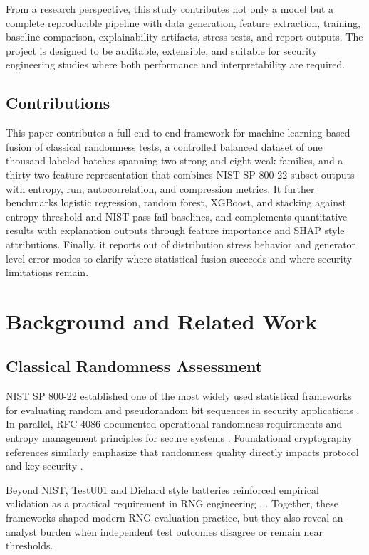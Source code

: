 \documentclass[conference]{IEEEtran}
\begin{document}
From a research perspective, this study contributes not only a model but a complete reproducible pipeline with data generation, feature extraction, training, baseline comparison, explainability artifacts, stress tests, and report outputs. The project is designed to be auditable, extensible, and suitable for security engineering studies where both performance and interpretability are required.

\subsection{Contributions}
This paper contributes a full end to end framework for machine learning based fusion of classical randomness tests, a controlled balanced dataset of one thousand labeled batches spanning two strong and eight weak families, and a thirty two feature representation that combines NIST SP 800-22 subset outputs with entropy, run, autocorrelation, and compression metrics. It further benchmarks logistic regression, random forest, XGBoost, and stacking against entropy threshold and NIST pass fail baselines, and complements quantitative results with explanation outputs through feature importance and SHAP style attributions. Finally, it reports out of distribution stress behavior and generator level error modes to clarify where statistical fusion succeeds and where security limitations remain.

\section{Background and Related Work}
\subsection{Classical Randomness Assessment}
NIST SP 800-22 established one of the most widely used statistical frameworks for evaluating random and pseudorandom bit sequences in security applications \cite{b1}. In parallel, RFC 4086 documented operational randomness requirements and entropy management principles for secure systems \cite{b2}. Foundational cryptography references similarly emphasize that randomness quality directly impacts protocol and key security \cite{b3}.

Beyond NIST, TestU01 and Diehard style batteries reinforced empirical validation as a practical requirement in RNG engineering \cite{b4}, \cite{b10}. Together, these frameworks shaped modern RNG evaluation practice, but they also reveal an analyst burden when independent test outcomes disagree or remain near thresholds.
\end{document}
